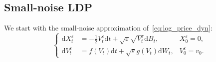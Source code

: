 \documentclass{amsart}[11pt]
\numberwithin{equation}{section}
\numberwithin{theorem}{subsection}
\numberwithin{proposition}{subsection}
\numberwithin{definition}{subsection}
\numberwithin{lemma}{subsection}
\numberwithin{assumption}{subsection}
\newcommand{\D}{\mathrm{d}}
\newcommand{\eps}{\varepsilon}
\newcommand{\seps}{\sqrt{\eps}}
\begin{document}
\subsection{Small-noise LDP}
We start with the small-noise approximation of~\eqref{eq:log_price_dyn}:
\begin{equation}\label{eq:log_price_dynNoise}
\left\{
\begin{array}{rll}
\D X_t^\eps & = \displaystyle  -\frac{1}{2}V_t^\eps \D t + \seps\sqrt{V_t^\eps} \D B_t, & X_0^\eps = 0,\\
\D V_t^\eps & = \displaystyle   f(V_t)\D t + \seps g(V_t)\D W_t, & V_0^\eps = v_0.
\end{array}
\right.
\end{equation}


\end{document}

